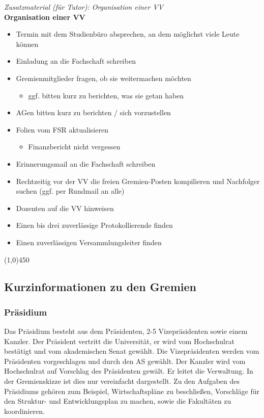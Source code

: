 \documentclass[a4paper,11pt]{scrartcl} %
\begin{document}
\begin{framed}
\textit{Zusatzmaterial (für Tutor): Organisation einer VV} \\

\textbf{Organisation einer VV}\\
\begin{itemize}
\item Termin mit dem Studienbüro absprechen, an dem möglichst viele Leute können
\item Einladung an die Fachschaft schreiben
\item Gremienmitglieder fragen, ob sie weitermachen möchten
\begin{itemize} \item ggf. bitten kurz zu berichten, was sie getan haben \end{itemize}
\item AGen bitten kurz zu berichten / sich vorzustellen
\item Folien vom FSR aktualisieren
\begin{itemize} \item Finanzbericht nicht vergessen \end{itemize}
\item Erinnerungsmail an die Fachschaft schreiben
\item Rechtzeitig vor der VV die freien Gremien-Posten kompilieren und Nachfolger suchen (ggf. per Rundmail an alle)
\item Dozenten auf die VV hinweisen
\item Einen bis drei zuverlässige Protokollierende finden
\item Einen zuverlässigen Versammlungsleiter finden
\end{itemize}
\end{framed}


\begin{center}
\line(1,0){450}
\end{center}

\subsection{Kurzinformationen zu den Gremien} 
\subsubsection{Präsidium} Das Präsidium besteht aus dem 
Präsidenten, 2-5 Vizepräsidenten sowie einem Kanzler. Der 
Präsident vertritt die Universität, er wird vom Hochschulrat 
bestätigt und vom akademischen Senat gewählt. Die 
Vizepräsidenten werden vom Präsidenten vorgeschlagen und durch den AS 
gewählt. Der Kanzler wird vom Hochschulrat auf Vorschlag des 
Präsidenten gewält. Er leitet die Verwaltung. In der 
Gremienskizze ist dies nur vereinfacht dargestellt. Zu den 
Aufgaben des Präsidiums gehören zum Beispiel, Wirtschaftspläne 
zu beschließen, Vorschläge für den Struktur- und 
Entwicklungsplan zu machen, sowie die Fakultäten zu 
koordinieren.
\end{document}
